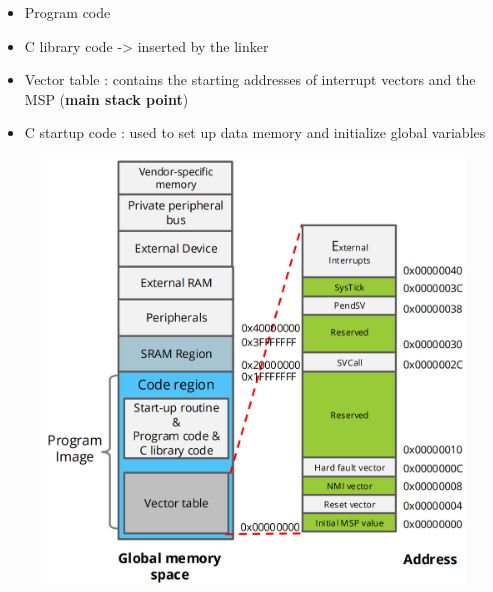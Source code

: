  \begin{minipage}{\linewidth}
      \centering
      \begin{minipage}{0.40\linewidth}
            \begin{itemize}
                \item Program code
                \item C library code -> inserted by the linker
                \item Vector table : contains the starting addresses of interrupt vectors and the MSP (\textbf{main stack point})
                \item C startup code : used to set up data memory and initialize global variables
            \end{itemize}
      \end{minipage}
      \hspace{0.05\linewidth}
      \begin{minipage}{0.45\linewidth}
          \begin{figure}[H]
                \centering
                \includegraphics[width=1\linewidth]{img/image29.png}
          \end{figure}
      \end{minipage}
  \end{minipage}


